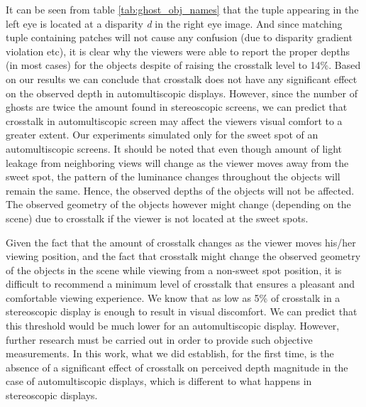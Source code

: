 It can be seen from table \ref{tab:ghost_obj_names} that the tuple appearing in the left eye is located at a disparity \emph{d} in the right eye image. And since matching tuple containing patches will not cause any confusion (due to disparity gradient violation etc), it is clear why the viewers were able to report the proper depths (in most cases) for the objects despite of raising the crosstalk level to 14\%. Based on our results we can conclude that crosstalk does not have any significant effect on the observed depth in automultiscopic displays. However, since the number of ghosts are twice the amount found in stereoscopic screens, we can predict that crosstalk in automultiscopic screen may affect the viewers visual comfort to a greater extent. Our experiments simulated only for the sweet spot of an automultiscopic screens. It should be noted that even though amount of light leakage from neighboring views will change as the viewer moves away from the sweet spot, the pattern of the luminance changes throughout the objects will remain the same. Hence, the observed depths of the objects will not be affected. The observed geometry of the objects however might change (depending on the scene) due to crosstalk if the viewer is not located at the sweet spots.

Given the fact that the amount of crosstalk changes as the viewer moves his/her viewing position, and the fact that crosstalk might change the observed geometry of the objects in the scene while viewing from a non-sweet spot position, it is difficult to recommend a minimum level of crosstalk that ensures a pleasant and comfortable viewing experience. We know that as low as 5\% of crosstalk in a stereoscopic display is enough to result in visual discomfort. We can predict that this threshold would be much lower for an automultiscopic display. However, further research must be carried out in order to provide such objective measurements. In this work, what we did establish, for the first time, is the absence of a significant effect of crosstalk on perceived depth magnitude in the case of automultiscopic displays, which is different to what happens in stereoscopic displays.

